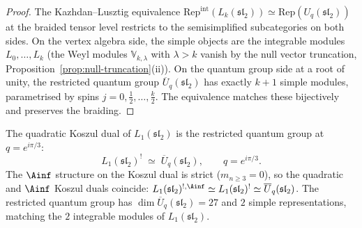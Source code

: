 \begin{proof}
The Kazhdan--Lusztig equivalence
$\mathrm{Rep}^{\mathrm{int}}(L_k(\mathfrak{sl}_2))
\simeq \mathrm{Rep}(U_q(\mathfrak{sl}_2))$
at the braided tensor level restricts to the
semisimplified subcategories on both sides. On the
vertex algebra side, the simple objects are the integrable
modules $L_0, \ldots, L_k$ (the Weyl modules
$\mathbb{V}_{k,\lambda}$ with $\lambda > k$ vanish by the
null vector truncation,
Proposition~\ref{prop:null-truncation}(ii)). On the
quantum group side at a root of unity, the restricted
quantum group $\overline{U}_q(\mathfrak{sl}_2)$ has
exactly $k + 1$ simple modules, parametrised by spins
$j = 0, \tfrac{1}{2}, \ldots, \tfrac{k}{2}$. The
equivalence matches these bijectively and preserves the
braiding.
\end{proof}

\begin{theorem}
\label{thm:L1-koszul-dual}
The quadratic Koszul dual of $L_1(\mathfrak{sl}_2)$ is
the restricted quantum group at $q = e^{i\pi/3}$:
\begin{equation}\label{eq:L1-koszul-dual}
 L_1(\mathfrak{sl}_2)^!
 \;\simeq\;
 \overline{U}_q(\mathfrak{sl}_2),
 \qquad
 q = e^{i\pi/3}.
\end{equation}
The $\Ainf$ structure on the Koszul dual is strict
\textup{(}$m_{n \ge 3} = 0$\textup{)}, so the quadratic
and $\Ainf$ Koszul duals coincide:
$L_1(\mathfrak{sl}_2)^{!,\Ainf}
\simeq L_1(\mathfrak{sl}_2)^!
\simeq \overline{U}_q(\mathfrak{sl}_2)$.
The restricted quantum group has
$\dim \overline{U}_q(\mathfrak{sl}_2) = 27$
and $2$ simple representations, matching the $2$ integrable
modules of $L_1(\mathfrak{sl}_2)$.
\end{theorem}


